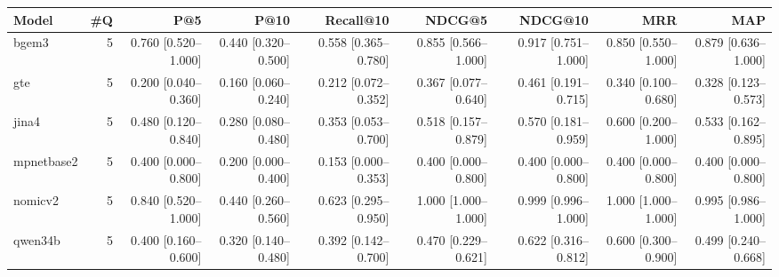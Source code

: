 \begin{tabular}{lrrrrrrrr}
\toprule
Model & \#Q & P@5 & P@10 & Recall@10 & NDCG@5 & NDCG@10 & MRR & MAP \\
\midrule
bgem3 & 5 & 0.760 [0.520–1.000] & 0.440 [0.320–0.500] & 0.558 [0.365–0.780] & 0.855 [0.566–1.000] & 0.917 [0.751–1.000] & 0.850 [0.550–1.000] & 0.879 [0.636–1.000] \\
gte & 5 & 0.200 [0.040–0.360] & 0.160 [0.060–0.240] & 0.212 [0.072–0.352] & 0.367 [0.077–0.640] & 0.461 [0.191–0.715] & 0.340 [0.100–0.680] & 0.328 [0.123–0.573] \\
jina4 & 5 & 0.480 [0.120–0.840] & 0.280 [0.080–0.480] & 0.353 [0.053–0.700] & 0.518 [0.157–0.879] & 0.570 [0.181–0.959] & 0.600 [0.200–1.000] & 0.533 [0.162–0.895] \\
mpnetbase2 & 5 & 0.400 [0.000–0.800] & 0.200 [0.000–0.400] & 0.153 [0.000–0.353] & 0.400 [0.000–0.800] & 0.400 [0.000–0.800] & 0.400 [0.000–0.800] & 0.400 [0.000–0.800] \\
nomicv2 & 5 & 0.840 [0.520–1.000] & 0.440 [0.260–0.560] & 0.623 [0.295–0.950] & 1.000 [1.000–1.000] & 0.999 [0.996–1.000] & 1.000 [1.000–1.000] & 0.995 [0.986–1.000] \\
qwen34b & 5 & 0.400 [0.160–0.600] & 0.320 [0.140–0.480] & 0.392 [0.142–0.700] & 0.470 [0.229–0.621] & 0.622 [0.316–0.812] & 0.600 [0.300–0.900] & 0.499 [0.240–0.668] \\
\bottomrule
\end{tabular}
